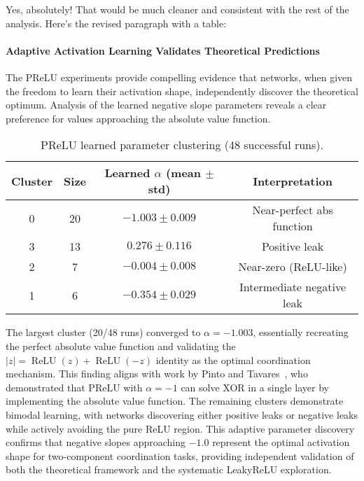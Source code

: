 Yes, absolutely! That would be much cleaner and consistent with the rest of the analysis. Here's the revised paragraph with a table:

\paragraph{Adaptive Activation Learning Validates Theoretical Predictions}
The PReLU experiments provide compelling evidence that networks, when given the freedom to learn their activation shape, independently discover the theoretical optimum. Analysis of the learned negative slope parameters reveals a clear preference for values approaching the absolute value function.

\begin{table}[ht]
\centering
\caption{PReLU learned parameter clustering (48 successful runs).}
\label{tab:relu1-prelu-learned}
\begin{tabular}{cccc}
\toprule
Cluster & Size & Learned $\alpha$ (mean $\pm$ std) & Interpretation \\
\midrule
0 & 20 & $-1.003 \pm 0.009$ & Near-perfect abs function \\
3 & 13 & $0.276 \pm 0.116$ & Positive leak \\
2 & 7 & $-0.004 \pm 0.008$ & Near-zero (ReLU-like) \\
1 & 6 & $-0.354 \pm 0.029$ & Intermediate negative leak \\
\bottomrule
\end{tabular}
\end{table}

The largest cluster (20/48 runs) converged to $\alpha = -1.003$, essentially recreating the perfect absolute value function and validating the $|z| = \operatorname{ReLU}(z) + \operatorname{ReLU}(-z)$ identity as the optimal coordination mechanism. This finding aligns with work by Pinto and Tavares~\cite{pinto2024prelu}, who demonstrated that PReLU with $\alpha = -1$ can solve XOR in a single layer by implementing the absolute value function. The remaining clusters demonstrate bimodal learning, with networks discovering either positive leaks or negative leaks while actively avoiding the pure ReLU region. This adaptive parameter discovery confirms that negative slopes approaching $-1.0$ represent the optimal activation shape for two-component coordination tasks, providing independent validation of both the theoretical framework and the systematic LeakyReLU exploration.



